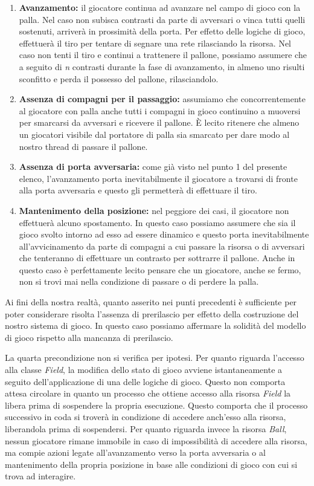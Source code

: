 \documentclass[aps,letterpaper,10pt]{article}
\begin{document}
\begin{enumerate}
	\item \textbf{Avanzamento:} il giocatore continua ad avanzare nel campo di gioco con la palla. Nel caso non subisca contrasti da parte di avversari o vinca tutti quelli sostenuti, arriver\`a in prossimit\`a della porta. Per effetto delle logiche di gioco, effettuer\`a il tiro per tentare di segnare una rete rilasciando la risorsa. Nel caso non tenti il tiro e continui a trattenere il pallone, possiamo assumere che a seguito di \emph{n} contrasti durante la fase di avanzamento, in almeno uno risulti sconfitto e perda il possesso del pallone, rilasciandolo.
	\item\textbf{Assenza di compagni per il passaggio:} assumiamo che concorrentemente al giocatore con palla anche tutti i compagni in gioco continuino a muoversi per smarcarsi da avversari e ricevere il pallone. \`E lecito ritenere che almeno un giocatori visibile dal portatore di palla sia smarcato per dare modo al nostro thread di passare il pallone.
	\item \textbf{Assenza di porta avversaria:} come gi\`a visto nel punto 1 del presente elenco, l'avanzamento porta inevitabilmente il giocatore a trovarsi di fronte alla porta avversaria e questo gli permetter\`a di effettuare il tiro.
	\item \textbf{Mantenimento della posizione:} nel peggiore dei casi, il giocatore non effettuer\`a alcuno spostamento. In questo caso possiamo assumere che sia il gioco svolto intorno ad esso ad essere dinamico e questo porta inevitabilmente all'avvicinamento da parte di compagni a cui passare la risorsa o di avversari che tenteranno di effettuare un contrasto per sottrarre il pallone. Anche in questo caso \`e perfettamente lecito pensare che un giocatore, anche se fermo, non si trovi mai nella condizione di passare o di perdere la palla.
\end{enumerate}

Ai fini della nostra realt\`a, quanto asserito nei punti precedenti \`e sufficiente per poter considerare risolta l'assenza di prerilascio per effetto della costruzione del nostro sistema di gioco. In questo caso possiamo affermare la solidit\`a del modello di gioco rispetto alla mancanza di prerilascio. \vspace{3mm}

La quarta precondizione non si verifica per ipotesi. Per quanto riguarda l'accesso alla classe \emph{Field}, la modifica dello stato di gioco avviene istantaneamente a seguito dell'applicazione di una delle logiche di gioco. Questo non comporta attesa circolare in quanto un processo che ottiene accesso alla risorsa \emph{Field} la libera prima di sospendere la propria esecuzione. Questo comporta che il processo successivo in coda si trover\`a in condizione di accedere anch'esso alla risorsa, liberandola prima di sospendersi. Per quanto riguarda invece la risorsa \emph{Ball}, nessun giocatore rimane immobile in caso di impossibilit\`a di accedere alla risorsa, ma compie azioni legate all'avanzamento verso la porta avversaria o al mantenimento della propria posizione in base alle condizioni di gioco con cui si trova ad interagire. \vspace{3mm}
\end{document}
